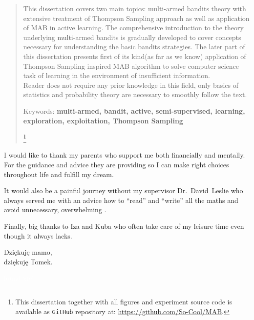 \documentclass[12pt, a4paper, pdflatex, leqno]{report}
\newenvironment{dedication}
  {\clearpage           %
   \thispagestyle{empty}%
   \vspace*{\stretch{1}}%
   \itshape             %
   \raggedright          %
   \par\setlength{\leftskip}{0.3\textwidth}\noindent\ignorespaces
  }
  {\par %
   \vspace{\stretch{3}} %
   \clearpage           %
  }
\begin{document}
\begin{abstract}
\thispagestyle{empty}%
This dissertation covers two main topics: multi-armed bandits theory with extensive treatment of Thompson Sampling approach as well as application of MAB in active learning. The comprehensive introduction to the theory underlying multi-armed bandits is gradually developed to cover concepts necessary for understanding the basic bandits strategies. The later part of this dissertation presents first of its kind(as far as we know) application of Thompson Sampling inspired MAB algorithm to solve computer science task of learning in the environment of insufficient information.\\
Reader does not require any prior knowledge in this field, only basics of statistics and probability theory are necessary to smoothly follow the text.\\
\begin{center}
Keywords: \textbf{multi-armed, bandit, active, semi-supervised, learning, exploration, exploitation, Thompson Sampling}

\let\thefootnote\relax\footnote{\noindent This dissertation together with all figures and experiment source code is available as \texttt{GitHub} repository at: \url{https://github.com/So-Cool/MAB}.}

\end{center}
\end{abstract}

\begin{dedication}
I would like to thank my parents who support me both financially and mentally. For the guidance and advice they are providing so I can make right choices throughout life and fulfill my dream.\newline

It would also be a painful journey without my supervisor Dr.~David~Leslie who always served me with an advice how to ``read'' and ``write'' all the maths and avoid unnecessary, overwhelming .\newline

Finally, big thanks to Iza and Kuba who often take care of my leisure time even though it always lacks.\\[2cm]


\begin{flushright}
Dzi\k{e}kuj\k{e} mamo,\\
dzi\k{e}kuj\k{e} Tomek.
\end{flushright}



\textcolor{white}{found me!}



\end{dedication}
\end{document}

